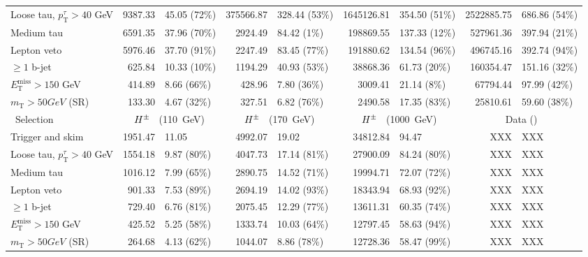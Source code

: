 \begin{table}[!thp]
\begin{center}
{\begin{tabular}{|l|r@{ $\pm$ }l|r@{ $\pm$ }l|r@{ $\pm$ }l|r@{ $\pm$ }l|}
			Loose tau, $p_\mathrm{T}^{\tau}>40$ GeV   & 9387.33 & 45.05 (72\%) & 375566.87 & 328.44 (53\%) & 1645126.81 & 354.50 (51\%) & 2522885.75 & 686.86 (54\%) \\
			Medium tau             & 6591.35 & 37.96 (70\%) & 2924.49 & 84.42 (1\%) & 198869.55 & 137.33 (12\%) & 527961.36 & 397.94 (21\%) \\
			Lepton veto  & 5976.46 & 37.70 (91\%) & 2247.49 & 83.45 (77\%) & 191880.62 & 134.54 (96\%) & 496745.16 & 392.74 (94\%) \\
			$\ge 1$ b-jet                    & 625.84 & 10.33 (10\%) & 1194.29 & 40.93 (53\%) & 38868.36 & 61.73 (20\%) & 160354.47 & 151.16 (32\%) \\
			$E_\mathrm{T}^\mathrm{miss}>150$ GeV\       & 414.89 & 8.66 (66\%) & 428.96 & 7.80 (36\%) & 3009.41 & 21.14 (8\%) & 67794.44 & 97.99 (42\%) \\
			$m_\mathrm{T}>50 GeV$ (SR)                          & 133.30 & 4.67 (32\%) & 327.51 & 6.82 (76\%) & 2490.58 & 17.35 (83\%) & 25810.61 &59.60 (38\%) \\
			\hline\
			Selection                                        & \multicolumn{2}{c|}{$H^{\pm}$ $\phantom{0}$(110~GeV)} & \multicolumn{2}{c|}{$H^{\pm}$ $\phantom{0}$(170~GeV)} & \multicolumn{2}{c|}{$H^{\pm}$ $\phantom{0}$(1000~GeV)} & \multicolumn{2}{c|}{Data (\LUMI )}  \\ 
			\hline
			Trigger and skim                            & 1951.47 & 11.05 & 4992.07 & 19.02 & 34812.84 & 94.47 & XXX & XXX \\
			Loose tau, $p_\mathrm{T}^{\tau}>40$ GeV   & 1554.18 & 9.87 (80\%) & 4047.73 & 17.14 (81\%) & 27900.09 & 84.24 (80\%) & XXX & XXX\\
			Medium tau             & 1016.12 & 7.99 (65\%) & 2890.75 & 14.52 (71\%) & 19994.71 & 72.07 (72\%) & XXX  & XXX\\
			Lepton veto  & 901.33 & 7.53 (89\%) & 2694.19 & 14.02 (93\%) & 18343.94 & 68.93 (92\%) & XXX & XXX\\
			$\ge 1$ b-jet                    & 729.40 & 6.76 (81\%) & 2075.45 & 12.29 (77\%) & 13611.31 & 60.35 (74\%) & XXX & XXX \\
			$E_\mathrm{T}^\mathrm{miss}>150$ GeV\       & 425.52 & 5.25 (58\%) & 1333.74 & 10.03 (64\%) & 12797.45 & 58.63 (94\%) & XXX & XXX \\
			$m_\mathrm{T}>50 GeV$ (SR)                          & 264.68 & 4.13 (62\%) & 1044.07 & 8.86 (78\%) & 12728.36 & 58.47 (99\%) & XXX & XXX \\
			\hline
			\end{tabular}}
			 \end{center}
	   \end{table}

